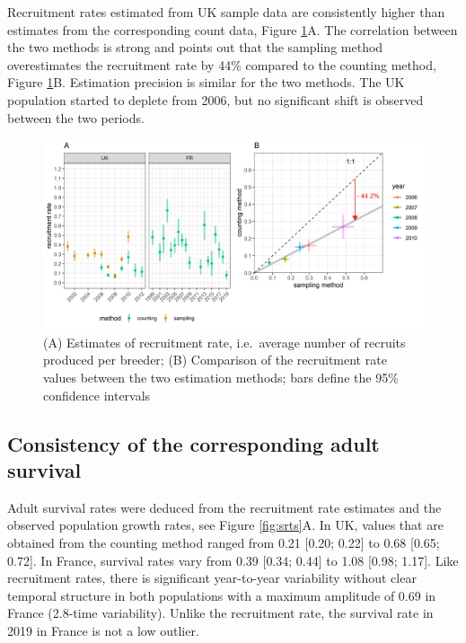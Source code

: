 \documentclass[
  english,
]{article}
\begin{document}
Recruitment rates estimated from UK sample data are consistently higher than estimates from the corresponding count data, Figure \ref{fig:rrts}A. The correlation between the two methods is strong and points out that the sampling method overestimates the recruitment rate by 44\% compared to the counting method, Figure \ref{fig:rrts}B. Estimation precision is similar for the two methods. The UK population started to deplete from 2006, but no significant shift is observed between the two periods.

\begin{figure}[H]

{\centering \includegraphics[width=1\linewidth]{../Output/plot_4} 

}

\caption{(A) Estimates of recruitment rate, i.e.~average number of recruits produced per breeder; (B) Comparison of the recruitment rate values between the two estimation methods; bars define the 95\% confidence intervals}\label{fig:rrts}
\end{figure}

\hypertarget{consistency-of-the-corresponding-adult-survival}{%
\subsection{Consistency of the corresponding adult survival}\label{consistency-of-the-corresponding-adult-survival}}

Adult survival rates were deduced from the recruitment rate estimates and the observed population growth rates, see Figure \ref{fig:srts}A. In UK, values that are obtained from the counting method ranged from 0.21 {[}0.20; 0.22{]} to 0.68 {[}0.65; 0.72{]}. In France, survival rates vary from 0.39 {[}0.34; 0.44{]} to 1.08 {[}0.98; 1.17{]}. Like recruitment rates, there is significant year-to-year variability without clear temporal structure in both populations with a maximum amplitude of 0.69 in France (2.8-time variability). Unlike the recruitment rate, the survival rate in 2019 in France is not a low outlier.
\end{document}
